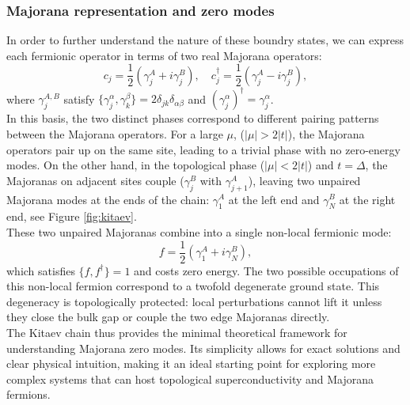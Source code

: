 \documentclass[11pt, letterpaper, titlepage]{article}
\begin{document}
\subsubsection{Majorana representation and zero modes}
In order to further understand the nature of these boundry states, we can express each fermionic operator in terms of two real Majorana operators:
\begin{equation}
c_j = \frac{1}{2}(\gamma_j^A + i\gamma_j^B), \quad
c_j^\dagger = \frac{1}{2}(\gamma_j^A - i\gamma_j^B),
\end{equation}
where $\gamma_j^{A,B}$ satisfy $\{\gamma_j^\alpha, \gamma_k^\beta\} = 2\delta_{jk}\delta_{\alpha\beta}$ and $(\gamma_j^\alpha)^\dagger = \gamma_j^\alpha$.\\
In this basis, the two distinct phases correspond to different pairing patterns between the Majorana operators. For a large $μ$, ($|μ| > 2|t|$), the Majorana operators pair up on the same site, leading to a trivial phase with no zero-energy modes. On the other hand, in the topological phase ($|μ| < 2|t|$) and $t = Δ$, the Majoranas on adjacent sites couple ($\gamma_j^B$ with $\gamma_{j+1}^A$), leaving two unpaired Majorana modes at the ends of the chain: $\gamma_1^A$ at the left end and $\gamma_N^B$ at the right end, see Figure \ref{fig:kitaev}.\\
These two unpaired Majoranas combine into a single non-local fermionic mode:
\begin{equation}
  f = \frac{1}{2 }(\gamma_1^A + i\gamma_N^B),
\end{equation}
which satisfies $\{f, f^\dagger\} = 1$ and costs zero energy. The two possible occupations of this non-local fermion correspond to a twofold degenerate ground state. This degeneracy is topologically protected: local perturbations cannot lift it unless they close the bulk gap or couple the two edge Majoranas directly.\\
The Kitaev chain thus provides the minimal theoretical framework for understanding Majorana zero modes. Its simplicity allows for exact solutions and clear physical intuition, making it an ideal starting point for exploring more complex systems that can host topological superconductivity and Majorana fermions.
\end{document}
